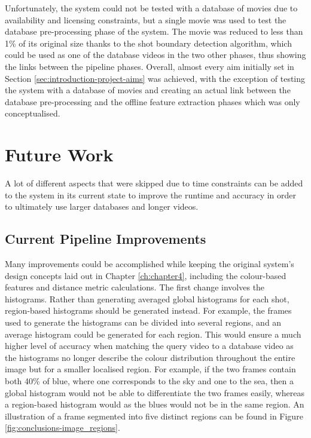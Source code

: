 Unfortunately, the system could not be tested with a database of movies due to availability and licensing constraints, but a single movie was used to test the database pre-processing phase of the system. The movie was reduced to less than 1\% of its original size thanks to the shot boundary detection algorithm, which could be used as one of the database videos in the two other phases, thus showing the links between the pipeline phases. Overall, almost every aim initially set in Section \ref{sec:introduction-project-aims} was achieved, with the exception of testing the system with a database of movies and creating an actual link between the database pre-processing and the offline feature extraction phases which was only conceptualised.
    

\section{Future Work}

A lot of different aspects that were skipped due to time constraints can be added to the system in its current state to improve the runtime and accuracy in order to ultimately use larger databases and longer videos.

\subsection{Current Pipeline Improvements}

Many improvements could be accomplished while keeping the original system's design concepts laid out in Chapter \ref{ch:chapter4}, including the colour-based features and distance metric calculations. The first change involves the histograms. Rather than generating averaged global histograms for each shot, region-based histograms should be generated instead. For example, the frames used to generate the histograms can be divided into several regions, and an average histogram could be generated for each region. This would ensure a much higher level of accuracy when matching the query video to a database video as the histograms no longer describe the colour distribution throughout the entire image but for a smaller localised region. For example, if the two frames contain both 40\% of blue, where one corresponds to the sky and one to the sea, then a global histogram would not be able to differentiate the two frames easily, whereas a region-based histogram would as the blues would not be in the same region. An illustration of a frame segmented into five distinct regions can be found in Figure \ref{fig:conclusions-image_regions}.\\

